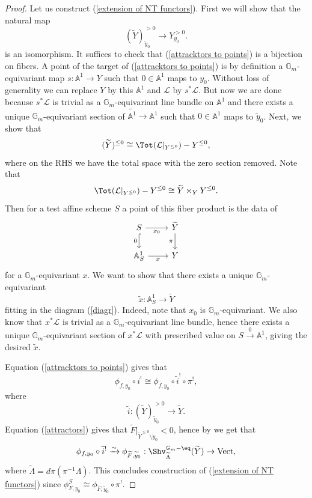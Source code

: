 \documentclass[9pt]{amsart}
\newcommand{\bA}{{\mathbb A}}
\newcommand{\bG}{{\mathbb G}}
\newcommand{\cG}{{\mathcal G}}
\newcommand{\cL}{{\mathcal L}}
\DeclareMathOperator{\Vect}{{Vect}}
\numberwithin{equation}{section}
\begin{document}
\begin{proof}
	Let us construct (\ref{extension of NT functors}). First we will show that the natural map 
	\begin{equation}\label{attracktors to points}
		(\widetilde{Y})^{>0}_{\widetilde{y}_0} \xrightarrow{} Y^{>0}_{y_0}.
	\end{equation}
	is an isomorphism. It suffices to check that (\ref{attracktors to points}) is a bijection on fibers. A point of the target of (\ref{attracktors to points}) is by definition a $\bG_m$-equivariant map $s: \bA^1 \rightarrow Y$ such that $0 \in \bA^1$ maps to $y_0$. Without loss of generality we can replace $Y$ by this $\bA^1$ and $\cL$ by $s^* \cL$. But now we are done because $s^* \cL$ is trivial as a $\bG_m$-equivariant line bundle on $\bA^1$ and there exists a unique $\bG_m$-equivariant section of $\widetilde{\bA^1} \rightarrow \bA^1$ such that $0 \in \bA^1$ maps to $\widetilde{y}_0$.
	Next, we show that 
	\begin{equation}\label{attractors}
		(\widetilde{Y})^{\leq 0} \cong \Tot(\cL|_{Y^{\leq 0}}) - Y^{\leq 0},
	\end{equation}
	where on the RHS we have the total space with the zero section removed. Note that $$\Tot(\cL|_{Y^{\leq 0}}) - Y^{\leq 0} \cong \widetilde{Y} \times_Y Y^{\leq 0}.$$
	Then for a test affine scheme $S$ a point of this fiber product is the data of 
\begin{equation}\label{diagr}
	\begin{tikzcd}
	S\ar[r, rightarrow, "x_0"']\ar[d, hookrightarrow, "0"']&   	\widetilde{Y}\ar[d, rightarrow, "\pi"']  \\
	\bA^1_S\ar[r, rightarrow, "x"']&   Y
	\end{tikzcd}
\end{equation}
for a $\bG_m$-equivariant $x$. We want to show that there exists a unique $\bG_m$-equivariant $$\widetilde{x}: \bA^1_S \rightarrow \widetilde{Y}$$
	fitting in the diagram (\ref{diagr}). Indeed, note that $x_0$ is $\bG_m$-equivariant. We also know that $x^*\cL$ is trivial as a $\bG_m$-equivariant line bundle, hence there exists a unique $\bG_m$-equivariant section of $x^*\cL$ with prescribed value on $S \xrightarrow{0} \bA^1$, giving the desired $\widetilde{x}$.
	
	Equation (\ref{attracktors to points}) gives that 
	\begin{equation}
		\phi_{f, y_0} \circ i^! \cong 	\phi_{f, y_0}  \circ \widetilde{i}^!\circ\pi^!, 
	\end{equation}
	where $$\widetilde{i}: (\widetilde{Y})^{>0}_{\widetilde{y}_0} \rightarrow \widetilde{Y}.$$
		Equation (\ref{attractors}) gives that $\widetilde{F}|_{\widetilde{Y}^{\leq 0} \setminus \widetilde{y}_0} < 0$, hence by \cite[Theorem 2.2.2] {NT} we get that 
	$$\phi_{f, y_0}  \circ \widetilde{i}^! \xrightarrow{\sim}  \phi_{\widetilde{F}, \widetilde{y}_0}: \Shv_{\widetilde{\Lambda}}^{\bG_m-\eq}(\widetilde{Y}) \rightarrow \Vect,$$
	where $\widetilde{\Lambda} = d \pi (\pi^{-1} \Lambda)$. This concludes construction of (\ref{extension of NT functors}) since $\phi^{\cG}_{F, {y}_0} \cong \phi_{\widetilde{F}, \widetilde{y}_0} \circ \pi^!$. 
	

\end{proof}
\end{document}
